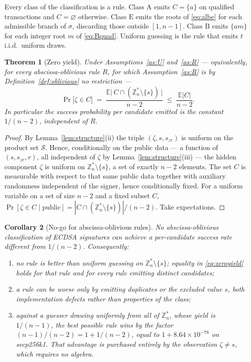 \documentclass[11pt,a4paper]{article}
\theoremstyle{plain}
\newtheorem{theorem}{Theorem}
\newtheorem{corollary}[theorem]{Corollary}
\theoremstyle{definition}
\theoremstyle{remark}
\newcommand{\Zs}{\mathbb{Z}_n^{*}}
\newcommand{\Ex}{\mathbb{E}}
\newcommand{\Pro}{\Pr}
\newcommand{\szr}{s_{zr}}
\newcommand{\clA}{\mathrm{A}}
\newcommand{\clB}{\mathrm{B}}
\newcommand{\clE}{\mathrm{E}}
\begin{document}
Every class of the classification is a rule. Class $\clA$ emits $C = \{a\}$ on qualified
transactions and $C = \varnothing$ otherwise. Class $\clE$ emits the roots of \eqref{eq:albe}
for each admissible branch of $\sigma$, discarding those outside $[1,n-1]$. Class $\clB$ emits
$\{am\}$ for each integer root $m$ of \eqref{eq:Bquad}. Uniform guessing is the rule that emits
$t$ i.i.d.\ uniform draws.

\begin{theorem}[Zero yield]\label{thm:zeroyield}
Under Assumptions~\ref{as:U} and~\ref{as:R} --- equivalently, for every abscissa-oblivious rule
$R$, for which Assumption~\ref{as:R} is by Definition~\ref{def:oblivious} no restriction ---
\begin{equation}\label{eq:zeroyield}
  \Pro\bigl[\zeta \in C\bigr]
  \;=\; \frac{\Ex\bigl|\,C \cap (\Zs\setminus\{s\})\,\bigr|}{n-2}
  \;\le\; \frac{\Ex|C|}{n-2}.
\end{equation}
In particular the success probability \emph{per candidate emitted} is the constant $1/(n-2)$,
independent of $R$.
\end{theorem}

\begin{proof}
By Lemma~\ref{lem:structure}(ii) the triple $(\zeta,s,\szr)$ is uniform on the product set
$\mathcal{S}$. Hence, conditionally on the public data --- a function of $(s,\szr,r)$, all
independent of $\zeta$ by Lemma~\ref{lem:structure}(iii) --- the hidden component $\zeta$ is
uniform on $\Zs\setminus\{s\}$, a set of exactly $n-2$ elements. The set $C$ is measurable with
respect to that same public data together with auxiliary randomness independent of the signer,
hence conditionally fixed. For a uniform variable on a set of size $n-2$ and a fixed subset $C$,
$\Pro[\zeta \in C \mid \text{public}] = |C \cap (\Zs\setminus\{s\})|/(n-2)$. Take expectations.
\end{proof}

\begin{corollary}[No-go for abscissa-oblivious rules]\label{cor:nogo}
No abscissa-oblivious classification of ECDSA signatures can achieve a per-candidate success rate
different from $1/(n-2)$. Consequently:
\begin{enumerate}[label=(\roman*),leftmargin=2.2em,itemsep=2pt]
\item no rule is \emph{better} than uniform guessing on $\Zs\setminus\{s\}$; equality in
  \eqref{eq:zeroyield} holds for that rule and for every rule emitting distinct candidates;
\item a rule can be \emph{worse} only by emitting duplicates or the excluded value $s$, both
  implementation defects rather than properties of the class;
\item against a guesser drawing uniformly from all of $\Zs$, whose yield is $1/(n-1)$, the best
  possible rule wins by the factor $(n-1)/(n-2) = 1 + 1/(n-2)$, equal to
  $1 + 8.64\times10^{-78}$ on secp256k1. That advantage is purchased entirely by the observation
  $\zeta \neq s$, which requires no algebra.
\end{enumerate}
\end{corollary}
\end{document}
